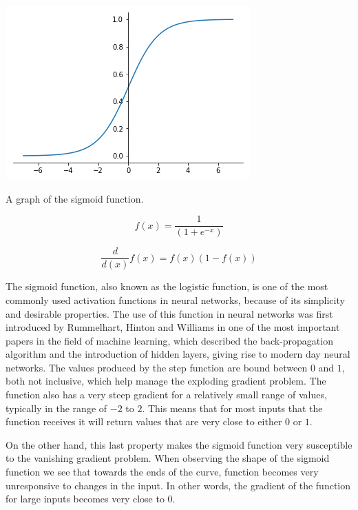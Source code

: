 \begin{marginfigure}
  \includegraphics{graphics/activation_functions/sigmoid_function.png}
  \label{fig:sigmoidfunction}
  \caption{
    A graph of the sigmoid function.
  }
\end{marginfigure}

\begin{equation}\label{sigmoidfunction}
    f(x) = \frac{1}{(1 + e^{-x})}
\end{equation}

\begin{equation}\label{sigmoidfunctionderivative}
    \frac{d}{d(x)}f(x) = f(x)(1-f(x))
\end{equation}

The sigmoid function, also known as the logistic function, is one of the most commonly used activation functions in neural networks, because of its simplicity and desirable properties. The use of this function in neural networks was first introduced by Rummelhart, Hinton and Williams in one of the most important papers in the field of machine learning, which described the back-propagation algorithm and the introduction of hidden layers, giving rise to modern day neural networks\cite{DavidE.Rumelhart1986Lrbb}.  The values produced by the step function are bound between $0$ and $1$, both not inclusive, which help manage the exploding gradient problem. The function also has a very steep gradient for a relatively small range of values, typically in the range of $-2$ to $2$. This means that for most inputs that the function receives it will return values that are very close to either $0$ or $1$.

On the other hand, this last property makes the sigmoid function very susceptible to the vanishing gradient problem\cite{bengio94}. When observing the shape of the sigmoid function we see that towards the ends of the curve, function becomes very unresponsive to changes in the input. In other words, the gradient of the function for large inputs becomes very close to $0$. 

